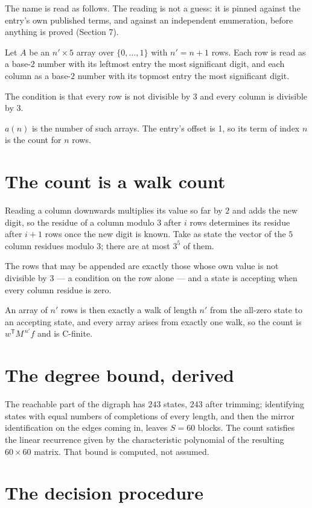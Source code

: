 \documentclass[11pt]{article}
\theoremstyle{definition}
\begin{document}
The name is read as follows. The reading is not a guess: it is pinned against the entry's own published terms, and against an independent enumeration, before anything is proved (Section 7).

Let $A$ be an $n' \times 5$ array over $\{0,\dots,1\}$ with $n' = n + 1$ rows. Each row is read as a base-$2$ number with its leftmost entry the most significant digit, and each column as a base-$2$ number with its topmost entry the most significant digit.

The condition is that every row is not divisible by $3$ and every column is divisible by $3$.

$a(n)$ is the number of such arrays. The entry's offset is 1, so its term of index $n$ is the count for $n$ rows.

\section{The count is a walk count}

Reading a column downwards multiplies its value so far by $2$ and adds the new digit, so the residue of a column modulo $3$ after $i$ rows determines its residue after $i+1$ rows once the new digit is known. Take as state the vector of the $5$ column residues modulo $3$; there are at most $3^{5}$ of them.

The rows that may be appended are exactly those whose own value is not divisible by $3$ --- a condition on the row alone --- and a state is accepting when every column residue is zero.

An array of $n'$ rows is then exactly a walk of length $n'$ from the all-zero state to an accepting state, and every array arises from exactly one walk, so the count is $w^{\mathsf T}M^{\,n'}f$ and is C-finite.

\section{The degree bound, derived}

The reachable part of the digraph has $243$ states, $243$ after trimming; identifying states with equal numbers of completions of every length, and then the mirror identification on the edges coming in, leaves $S = 60$ blocks. The count satisfies the linear recurrence given by the characteristic polynomial of the resulting $60\times60$ matrix. That bound is computed, not assumed.

\section{The decision procedure}
\end{document}
